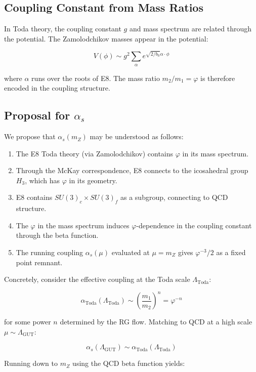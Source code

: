 \documentclass{article}
\begin{document}
\subsection{Coupling Constant from Mass Ratios}

In Toda theory, the coupling constant $g$ and mass spectrum are related through the potential. The Zamolodchikov masses appear in the potential:

\[
V(\phi) \sim g^2 \sum_{\alpha} e^{\sqrt{2/b_0} \alpha \cdot \phi}
\]

where $\alpha$ runs over the roots of E8. The mass ratio $m_2/m_1 = \varphi$ is therefore encoded in the coupling structure.

\subsection{Proposal for $\alpha_s$}

We propose that $\alpha_s(m_Z)$ may be understood as follows:

\begin{enumerate}
    \item The E8 Toda theory (via Zamolodchikov) contains $\varphi$ in its mass spectrum.
    \item Through the McKay correspondence, E8 connects to the icosahedral group $H_3$, which has $\varphi$ in its geometry.
    \item E8 contains $SU(3)_c \times SU(3)_f$ as a subgroup, connecting to QCD structure.
    \item The $\varphi$ in the mass spectrum induces $\varphi$-dependence in the coupling constant through the beta function.
    \item The running coupling $\alpha_s(\mu)$ evaluated at $\mu = m_Z$ gives $\varphi^{-3}/2$ as a fixed point remnant.
\end{enumerate}

Concretely, consider the effective coupling at the Toda scale $\Lambda_{\text{Toda}}$:

\[
\alpha_{\text{Toda}}(\Lambda_{\text{Toda}}) \sim \left(\frac{m_1}{m_2}\right)^n = \varphi^{-n}
\]

for some power $n$ determined by the RG flow. Matching to QCD at a high scale $\mu \sim \Lambda_{\text{GUT}}$:

\[
\alpha_s(\Lambda_{\text{GUT}}) \sim \alpha_{\text{Toda}}(\Lambda_{\text{Toda}})
\]

Running down to $m_Z$ using the QCD beta function yields:
\end{document}
